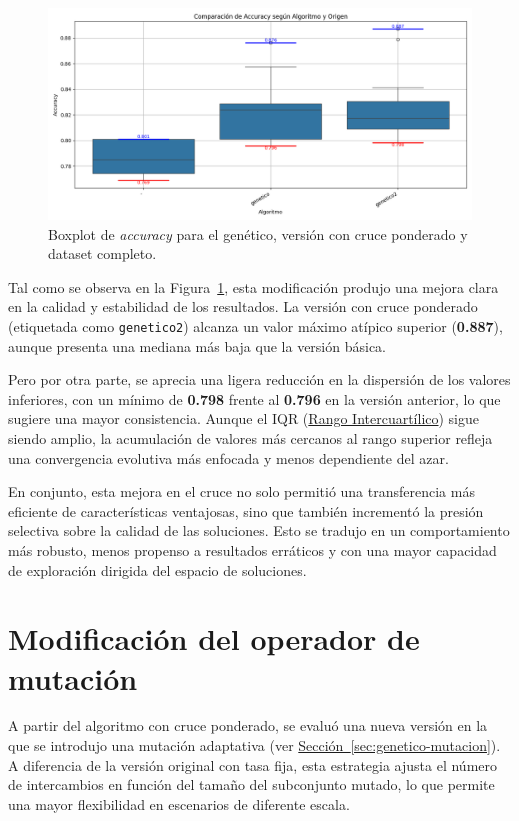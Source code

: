 \begin{figure}[H]
    \centering
    \includegraphics[width=1\textwidth]{imagenes/evaluaciones/operador-de-cruce}
    \caption{Boxplot de \textit{accuracy} para el genético, versión con cruce ponderado y dataset completo.}
    \label{fig:cruce_ponderado}
\end{figure}

Tal como se observa en la Figura~\ref{fig:cruce_ponderado}, esta modificación produjo una mejora clara en la calidad y estabilidad de los resultados.
La versión con cruce ponderado (etiquetada como \texttt{genetico2}) alcanza un valor máximo atípico superior (\textbf{0.887}),
aunque presenta una mediana más baja que la versión básica.

Pero por otra parte, se aprecia una ligera reducción en la dispersión de los valores inferiores,
con un mínimo de \textbf{0.798} frente al \textbf{0.796} en la versión anterior, lo que sugiere una mayor consistencia.
Aunque el IQR (\hyperref[subsec:visualizacion-de-resultados]{Rango Intercuartílico}) sigue siendo amplio,
la acumulación de valores más cercanos al rango superior refleja una convergencia evolutiva más enfocada y menos dependiente del azar.

En conjunto, esta mejora en el cruce no solo permitió una transferencia más eficiente de características ventajosas,
sino que también incrementó la presión selectiva sobre la calidad de las soluciones.
Esto se tradujo en un comportamiento más robusto, menos propenso a resultados erráticos y con una mayor capacidad de exploración dirigida del espacio de soluciones.


\section{Modificación del operador de mutación}\label{sec:modificacion-mutacion}
A partir del algoritmo con cruce ponderado, se evaluó una nueva versión en la que se introdujo una mutación adaptativa
(ver \hyperref[sec:genetico-mutacion]{Sección~\ref*{sec:genetico-mutacion}}).
A diferencia de la versión original con tasa fija, esta estrategia ajusta el número de intercambios en función del tamaño del subconjunto mutado, 
lo que permite una mayor flexibilidad en escenarios de diferente escala.

